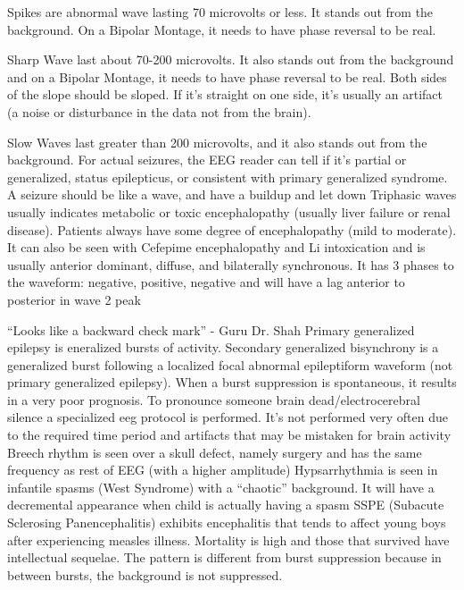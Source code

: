 \documentclass[12pt]{article}
\begin{document}
Spikes are abnormal wave lasting 70 microvolts or less. It stands out from the background. On a Bipolar Montage, it needs to have phase reversal to be real. 

Sharp Wave last about 70-200 microvolts. It also stands out from the background and on a Bipolar Montage, it needs to have phase reversal to be real. Both sides of the slope should be sloped. If it’s straight on one side, it’s usually an artifact (a noise or disturbance in the data not from the brain). 

Slow Waves last greater than 200 microvolts, and it also stands out from the background.
\medskip
	For actual seizures, the EEG reader can tell if it’s partial or generalized, status epilepticus, or consistent with primary generalized syndrome. A seizure should be like a wave, and have a buildup and let down
\medskip
	Triphasic waves usually indicates metabolic or toxic encephalopathy (usually liver failure or renal disease). Patients always have some degree of encephalopathy (mild to moderate). It can also be seen with Cefepime encephalopathy and Li intoxication and is usually anterior dominant, diffuse, and bilaterally synchronous. It has 3 phases to the waveform: negative, positive, negative and will have a lag anterior to posterior in wave 2 peak

“Looks like a backward check mark” - Guru Dr. Shah
\medskip
Primary generalized epilepsy is eneralized bursts of activity. Secondary generalized bisynchrony is a generalized burst following a localized focal abnormal epileptiform waveform (not primary generalized epilepsy).
\medskip
When a burst suppression is spontaneous, it results in a very poor prognosis.
\medskip
To pronounce someone brain dead/electrocerebral silence a specialized eeg protocol is performed. It's not performed very often due to the required time period and artifacts that may be mistaken for brain activity
\medskip
Breech rhythm is seen over a skull defect, namely surgery and has the same frequency as rest of EEG (with a higher amplitude)
\medskip
Hypsarrhythmia is seen in infantile spasms (West Syndrome) with a “chaotic” background. It will have a decremental appearance when child is actually having a spasm 
\medskip
SSPE (Subacute Sclerosing Panencephalitis) exhibits encephalitis that tends to affect young boys after experiencing measles illness. Mortality is high and those that survived have intellectual sequelae. The pattern is different from burst suppression because in between bursts, the background is not suppressed.
\end{document}
